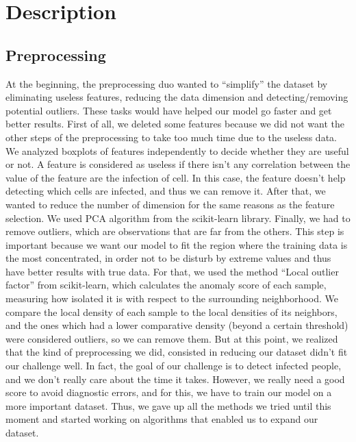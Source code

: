 \documentclass[10pt]{report}
\begin{document}
\bigbreak

\section*{Description}

\bigbreak

\subsection*{Preprocessing}

\bigbreak

At the beginning, the preprocessing duo wanted to “simplify” the dataset by eliminating useless features, reducing the data dimension and detecting/removing potential outliers. These tasks would have helped our model go faster and get better results.  \medbreak
First of all, we deleted some features because we did not want the other steps of the preprocessing to take too much time due to the useless data. We analyzed boxplots of features independently to decide whether they are useful or not. A feature is considered as useless if there isn’t any correlation between the value of the feature are the infection of cell. In this case, the feature doesn’t help detecting which cells are infected, and thus we can remove it. \medbreak
After that, we wanted to reduce the number of dimension for the same reasons as the feature selection. We used PCA algorithm from the scikit-learn library. \medbreak
Finally, we had to remove outliers, which are observations that are far from the others. This step is important because we want our model to fit the region where the training data is the most concentrated, in order not to be disturb by extreme values and thus have better results with true data. For that, we used the method “Local outlier factor” from scikit-learn, which calculates the anomaly score of each sample, measuring how isolated it is with respect to the surrounding neighborhood. We compare the local density of each sample to the local densities of its neighbors, and the ones which had a lower comparative density (beyond a certain threshold) were considered outliers, so we can remove them. \medbreak
But at this point, we realized that the kind of preprocessing we did, consisted in reducing our dataset didn’t fit our challenge well. In fact, the goal of our challenge is to detect infected people, and we don’t really care about the time it takes. However, we really need a good score to avoid diagnostic errors, and for this, we have to train our model on a more important dataset. Thus, we gave up all the methods we tried until this moment and started working on algorithms that enabled us to expand our dataset. \medbreak
\end{document}
